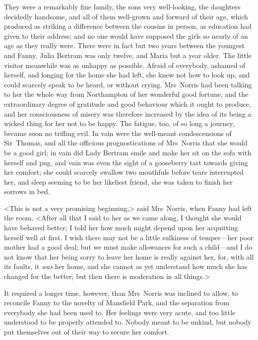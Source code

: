 They were a remarkably fine family, the sons very well-looking, the daughters decidedly handsome, and all of them well-grown and forward of their age, which produced as striking a difference between the cousins in person, as education had given to their address; and no one would have supposed the girls so nearly of an age as they really were. There were in fact but two years between the youngest and Fanny. Julia Bertram was only twelve, and Maria but a year older. The little visitor meanwhile was as unhappy as possible. Afraid of everybody, ashamed of herself, and longing for the home she had left, she knew not how to look up, and could scarcely speak to be heard, or without crying. Mrs~Norris had been talking to her the whole way from Northampton of her wonderful good fortune, and the extraordinary degree of gratitude and good behaviour which it ought to produce, and her consciousness of misery was therefore increased by the idea of its being a wicked thing for her not to be happy. The fatigue, too, of so long a journey, became soon no trifling evil. In vain were the well-meant condescensions of Sir~Thomas, and all the officious prognostications of Mrs~Norris that she would be a good girl; in vain did Lady Bertram smile and make her sit on the sofa with herself and pug, and vain was even the sight of a gooseberry tart towards giving her comfort; she could scarcely swallow two mouthfuls before tears interrupted her, and sleep seeming to be her likeliest friend, she was taken to finish her sorrows in bed.

<This is not a very promising beginning,> said Mrs~Norris, when Fanny had left the room. <After all that I said to her as we came along, I thought she would have behaved better; I told her how much might depend upon her acquitting herself well at first. I wish there may not be a little sulkiness of temper—her poor mother had a good deal; but we must make allowances for such a child—and I do not know that her being sorry to leave her home is really against her, for, with all its faults, it \textit{was}  her home, and she cannot as yet understand how much she has changed for the better; but then there is moderation in all things.>

It required a longer time, however, than Mrs~Norris was inclined to allow, to reconcile Fanny to the novelty of Mansfield Park, and the separation from everybody she had been used to. Her feelings were very acute, and too little understood to be properly attended to. Nobody meant to be unkind, but nobody put themselves out of their way to secure her comfort.

